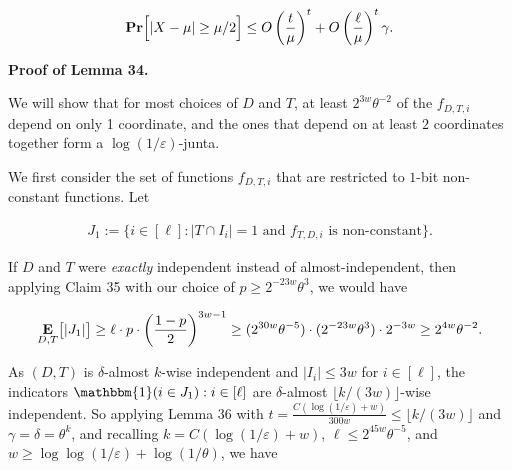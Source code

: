 \[\begin{gathered}
\mathop{\bf Pr\/}\Bigl{[}\lvert X-\mu\rvert\geq\mu/2\Bigr{]}\leq O\left(\frac{t}{\mu}\right)^{t}+O\left(\frac{\ell}{\mu}\right)^{t}\gamma.
\end{gathered}\]







\par\medskip\noindent\textbf{Proof of Lemma 34.}\par




We will show that for most choices of $D$ and $T$, at least $2^{3w}\theta^{-2}$ of the $f_{D,T,i}$ depend on only 1 coordinate, and the ones that depend on at least $2$ coordinates together form a $\log(1/\varepsilon)$-junta.\par




We first consider the set of functions $f_{D,T,i}$ that are restricted to $1$-bit non-constant functions.
Let\par


\[\begin{gathered}
J_{1}:=\{i\in[\ell]:\text{$\lvert T\cap I_{i}\rvert=1$ and $f_{T,D,i}$ is non-constant}\}.
\end{gathered}\]


If $D$ and $T$ were \emph{exactly} independent instead of almost-independent, then applying Claim 35 with our choice of $p\geq 2^{-23w}\theta^{3}$, we would have\par


\[\begin{gathered}
\mathop{\bf E\/}_{D,T}\bigl{[}\lvert J_{1}\rvert\bigr{]}\geq\ell\cdot p\cdot\left(\frac{1-p}{2}\right)^{3w-1}\geq(2^{30w}\theta^{-5})\cdot(2^{-23w}\theta^{3})\cdot 2^{-3w}\geq 2^{4w}\theta^{-2}.
\end{gathered}\]


As $(D,T)$ is $\delta$-almost $k$-wise independent and $\lvert I_{i}\rvert\leq 3w$ for $i\in[\ell]$, the indicators $\mathbbm{1}(i\in J_{1}):i\in[\ell]$ are $\delta$-almost $\lfloor k/(3w)\rfloor$-wise independent.
So applying Lemma 36 with $t=\frac{C(\log(1/\varepsilon)+w)}{300w}\leq\lfloor k/(3w)\rfloor$ and $\gamma=\delta=\theta^{k}$, and recalling $k=C(\log(1/\varepsilon)+w)$, $\ell\leq 2^{45w}\theta^{-5}$, and $w\geq\log\log(1/\varepsilon)+\log(1/\theta)$, we have\par



